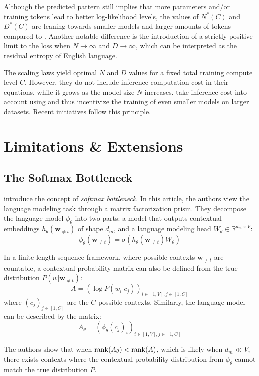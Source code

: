 Although the predicted pattern still implies that more parameters and/or training tokens lead to better log-likelihood levels, the values of $N^*(C)$ and $D^*(C)$ are leaning towards smaller models and larger amounts of tokens compared to \citet{kaplan_scaling}. Another notable difference is the introduction of a strictly positive limit to the loss when $N \rightarrow \infty$ and $D \rightarrow \infty$, which can be interpreted as the residual entropy of English language.

The scaling laws yield optimal $N$ and $D$ values for a fixed total training compute level $C$. However, they do not include inference computation cost in their equations, while it grows as the model size $N$ increases. \citet{beyond_chinchilla} take inference cost into account using  and thus incentivize the training of even smaller models on larger datasets. Recent initiatives \citep{tinyllama,faysse2024croissantllm,gemmateam2024gemma} follow this principle.

\section{Limitations \& Extensions}

\subsection{The Softmax Bottleneck}
\label{ssec:softmax_bottleneck}

\citet{softmax_bottleneck} introduce the concept of \textit{softmax bottleneck}. In this article, the authors view the language modeling task through a matrix factorization prism. They decompose the language model $\phi_\theta$ into two parts: a model that outputs contextual embeddings $h_\theta(\mathbf{w}_{\neq t})$ of shape $d_m$, and a language modeling head $W_\theta \in \mathbb{R}^{d_m \times V}$\!:
$$
\phi_\theta(\mathbf{w}_{\neq t}) = \sigma (h_\theta(\mathbf{w}_{\neq t}) W_\theta)
$$

In a finite-length sequence framework, where possible contexts $\mathbf{w}_{\neq t}$ are countable, a contextual probability matrix can also be defined from the true distribution $P(w | \mathbf{w}_{\neq t})$:
$$
A = (\log P(w_i | c_j))_{i \in [1, V], j \in [1, C]}
$$
where $(c_j)_{j\in [1, C]}$ are the $C$ possible contexts.
Similarly, the language model can be described by the matrix:
$$
A_\theta = (\phi_\theta(c_j)_i)_{i \in [1, V], j \in [1, C]}
$$ 

The authors show that when $\operatorname{rank} (A_\theta) < \operatorname{rank} (A)$, which is likely when $d_m \ll V$, there exists contexts where the contextual probability distribution from $\phi_\theta$ cannot match the true distribution $P$.


